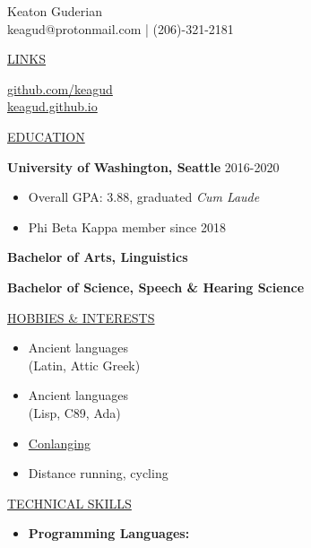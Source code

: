 \documentclass[11pt]{article}
\newcommand{\resumetitle}[3]{
    \AddToShipoutPictureBG{
        \AtPageUpperLeft {
        \raisebox{-0.09\paperheight}{
            \color{black!85}\rule{2\paperwidth}{\paperheight}}
        }}
    \begin{Center}
        \begingroup
        \titlethin
        \color{black!10}\Huge{#1}
        \titlethick
        \color{black!5}\Huge{#2} \\
        \vspace{2mm}
        \textrm{\color{black!15}\Large{#3}}
        \endgroup
    \end{Center}
    \vspace{7mm}
}
\newcommand{\betteruline}[1]{
    \uline{#1}
}
\newcommand{\sectiontitle}[1]{
    \begingroup
        \titlebold
        \betteruline{\Large\uppercase{#1}  }
        \vspace{1.7mm}
    \endgroup
}
\newcommand{\sectioncontent}[1]{
    \begingroup
        \begin{FlushLeft}
        \vspace{-3mm}
        \sffamily\small#1
        \end{FlushLeft}
    \endgroup
    \vspace{2mm}
}
\begin{document}
    \resumetitle{Keaton}{Guderian} {
      keagud@protonmail.com | (206)-321-2181
    }

    \setlength{\columnsep}{7mm}
    \begin{paracol}{2}

    \sectiontitle{links}
    \sectioncontent{
        \hspace{2mm}
        \href{{{https://github.com/keagud}}}{github.com/keagud} \\
        \faIcon{link}\hspace{1.8mm}
        \href{keagud.github.io}{keagud.github.io}
    }

    \sectiontitle{education}
    \sectioncontent{
        \begingroup
      \textbf{University of Washington, Seattle }\hfill\color{black!70}\small{2016-2020}
        \endgroup
      \begin{itemize}
      \item Overall GPA: 3.88, graduated \textit{Cum Laude}
      \item Phi Beta Kappa member since 2018
        \end{itemize}
      \item \textbf{Bachelor of Arts, Linguistics }
        \item \textbf{Bachelor of Science, Speech \& Hearing Science}
      } 

    \sectiontitle{Hobbies \& Interests}
    \sectioncontent{
      \begin{itemize}
        \item Ancient languages \\ (Latin, Attic Greek)
        \item Ancient languages \\  (Lisp, C89, Ada)
        \item \href{https://en.wikipedia.org/wiki/Constructed\_language}{Conlanging}
        \item Distance running, cycling

      \end{itemize}
    }

    \switchcolumn
    
      

    \sectiontitle{Technical Skills}
    \sectioncontent{
      
      
      \begin{itemize}
        \item \textbf{Programming Languages: }
          \begin{itemize}
          

\end{itemize}
\end{itemize}}
\end{paracol}
\end{document}
